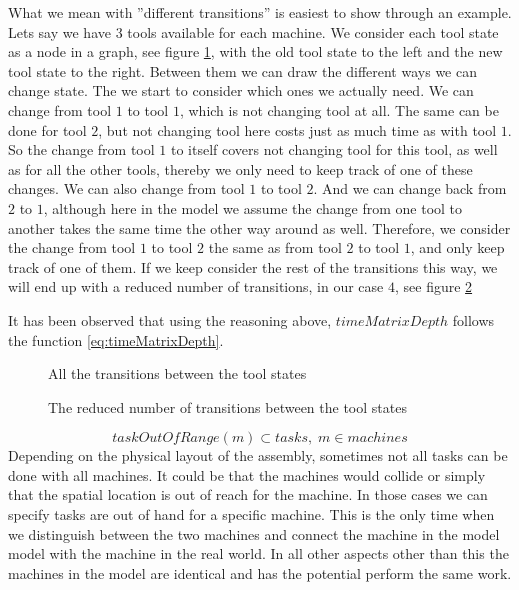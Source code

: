  What we mean with ''different transitions'' is easiest to show through an example. Lets say we have $3$ tools available for each machine. We consider each tool state as a node in a graph, see figure \ref{fig:tools_trans_bef}, with the old tool state to the left and the new tool state to the right. Between them we can draw the different ways we can change state. The we start to consider which ones we actually need. We can change from tool $1$ to tool $1$, which is not changing tool at all. The same can be done for tool $2$, but not changing tool here costs just as much time as with tool $1$. So the change from tool $1$ to itself covers not changing tool for this tool, as well as for all the other tools, thereby we only need to keep track of one of these changes. We can also change from tool $1$ to tool $2$. And we can change back from $2$ to $1$, although here in the model we assume the change from one tool to another takes the same time the other way around as well. Therefore, we consider the change from tool $1$ to tool $2$ the same as from tool $2$ to tool $1$, and only keep track of one of them. If we keep consider the rest of the transitions this way, we will end up with a reduced number of transitions, in our case $4$, see figure \ref{fig:tools_trans_aft}
 
 It has been observed that using the reasoning above, $timeMatrixDepth$ follows the function \ref{eq:timeMatrixDepth}.
 
 \begin{figure}
 	\centering
 	
 	\caption{All the transitions between the tool states}
 	\label{fig:tools_trans_bef}
 \end{figure}
 
 \begin{figure}
 	\centering
  	
  	\caption{The reduced number of transitions between the tool states}
  	\label{fig:tools_trans_aft}
 \end{figure}
 
 \begin{equation}\label{eq:56}
 taskOutOfRange(m) \subset tasks, \; m \in machines
 \end{equation}
Depending on the physical layout of the assembly, sometimes not all tasks can be done with all machines. It could be that the machines would collide or simply that the spatial location is out of reach for the machine. In those cases we can specify tasks are out of hand for a specific machine. This is the only time when we distinguish between the two machines and connect the machine in the model model with the machine in the real world. In all other aspects other than this the machines in the model are identical and has the potential perform the same work.
 
